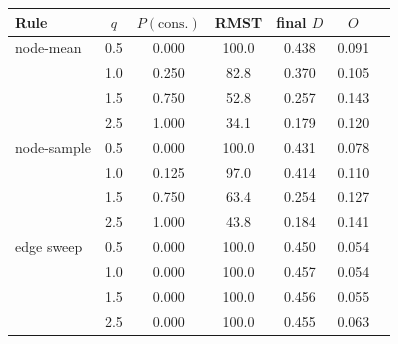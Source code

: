 \begin{tabular}{@{}lcccccc@{}}
\toprule
Rule & $q$ & $P(\mathrm{cons.})$ & RMST & final $D$ & $O$ \\
\midrule
node-mean & 0.5 & 0.000 & 100.0 & 0.438 & 0.091 \\
 & 1.0 & 0.250 & 82.8 & 0.370 & 0.105 \\
 & 1.5 & 0.750 & 52.8 & 0.257 & 0.143 \\
 & 2.5 & 1.000 & 34.1 & 0.179 & 0.120 \\
\midrule
node-sample & 0.5 & 0.000 & 100.0 & 0.431 & 0.078 \\
 & 1.0 & 0.125 & 97.0 & 0.414 & 0.110 \\
 & 1.5 & 0.750 & 63.4 & 0.254 & 0.127 \\
 & 2.5 & 1.000 & 43.8 & 0.184 & 0.141 \\
\midrule
edge sweep & 0.5 & 0.000 & 100.0 & 0.450 & 0.054 \\
 & 1.0 & 0.000 & 100.0 & 0.457 & 0.054 \\
 & 1.5 & 0.000 & 100.0 & 0.456 & 0.055 \\
 & 2.5 & 0.000 & 100.0 & 0.455 & 0.063 \\
\bottomrule
\end{tabular}
